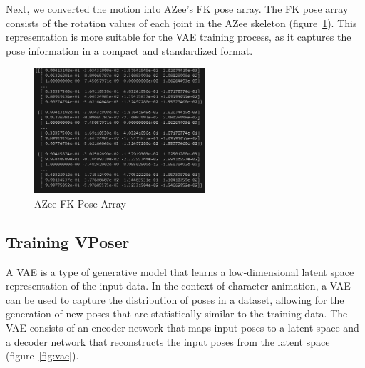 \documentclass[../../main.tex]{subfiles}
\begin{document}
Next, we converted the motion into AZee's FK pose array. The FK pose array consists of the rotation values of each joint in the AZee skeleton (figure~\ref{fig:azee_fk_pose}). This representation is more suitable for the VAE training process, as it captures the pose information in a compact and standardized format.

\begin{figure}
  \centering \includegraphics[width = 2.5in]{chapters/pose_correction/images/azee_fk_pose.png}
  \caption{AZee FK Pose Array}
  \label{fig:azee_fk_pose}
\end{figure}

\subsection{Training VPoser}
\label{ch:pose_correction:pose_correction_with_azee:training}

A VAE is a type of generative model that learns a low-dimensional latent space representation of the input data. In the context of character animation, a VAE can be used to capture the distribution of poses in a dataset, allowing for the generation of new poses that are statistically similar to the training data. The VAE consists of an encoder network that maps input poses to a latent space and a decoder network that reconstructs the input poses from the latent space (figure~\ref{fig:vae}).
\end{document}
